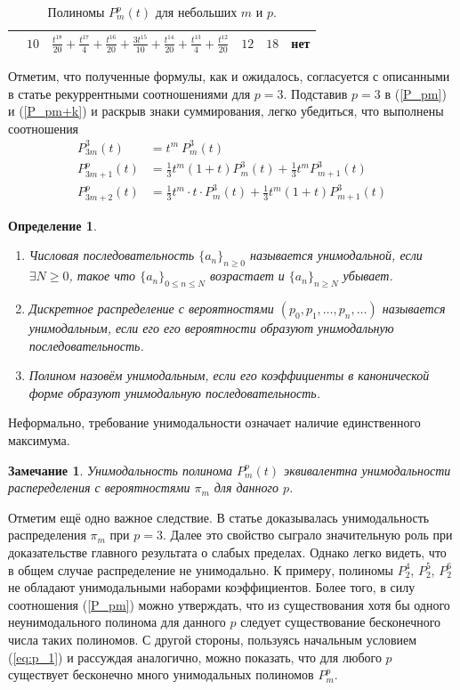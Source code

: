 \documentclass[14pt, a4paper, russian]{report}
\newtheorem{remark}{\indent Замечание}
\newtheorem{definition}{\indent Определение}
\begin{document}
\begin{table}[H]
\begin{small}
\begin{center}
\begin{tabular}{|c|c|c|c|c|c|}
                    & $10$ & $\frac{t^{18}}{20}+\frac{t^{17}}{4}+\frac{t^{16}}{20}+\frac{3 t^{15}}{10}+\frac{t^{14}}{20}+\frac{t^{13}}{4}+\frac{t^{12}}{20}$ & $12$ & $18$ & нет \\
\hline
\end{tabular}
\end{center}
\end{small}
\caption{\label{table:polynomials} Полиномы $P_m^p(t)$ для небольших $m$ и $p$.}
\end{table}

Отметим, что полученные формулы, как и ожидалось, согласуется с описанными в статье \cite{weaklimits} рекуррентными соотношениями для $p=3$. Подставив $p=3$ в (\ref{P_pm}) и (\ref{P_pm+k}) и раскрыв знаки суммирования, легко убедиться, что выполнены соотношения
\begin{align*}
P_{3m}^3(t) & =  t^{m}\ P_m^3(t) \\
P_{3m+1}^p(t) & =  \frac{1}{3} t^m (1 + t) P_m^3(t)  + \frac{1}{3} t^m P_{m+1}^3(t)\\
P_{3m+2}^p(t) & =  \frac{1}{3} t^m \cdot t\cdot  P_m^3(t)  + \frac{1}{3} t^m (1+t) P_{m+1}^3(t)
\end{align*}

\begin{definition} \nobreakspace\\
\begin{enumerate}
\item Числовая последовательность $\{a_n\}_{n \ge 0}$ называется унимодальной, если $\exists N \ge 0$, такое что $\{a_n\}_{0 \le n \le N}$ возрастает и $\{a_n\}_{n \ge N}$ убывает.
\item Дискретное распределение с вероятностями $(p_0,p_1,\ldots,p_n,\ldots)$ называется унимодальным, если его его вероятности образуют унимодальную последовательность.
\item Полином назовём унимодальным, если его коэффициенты в канонической форме образуют унимодальную последовательность.
\end{enumerate}
\end{definition}
Неформально, требование унимодальности означает наличие единственного максимума.
\begin{remark}
Унимодальность полинома $P_m^p(t)$ эквивалентна унимодальности распеределения с вероятностями $\pi_m$ для данного $p$.
\end{remark}

Отметим ещё одно важное следствие. В статье \cite{weaklimits} доказывалась унимодальность распределения $\pi_m$ при $p=3$. Далее это свойство сыграло значительную роль при доказательстве главного результата о слабых пределах. Однако легко видеть, что в общем случае распределение не унимодально. К примеру, полиномы $P_2^4$, $P_2^5$, $P_2^6$ не обладают унимодальными наборами коэффициентов. Более того, в силу соотношения (\ref{P_pm}) можно утверждать, что из существования хотя бы одного неунимодального полинома для данного $p$ следует существование бесконечного числа таких полиномов. С другой стороны, пользуясь начальным условием (\ref{eq:p_1}) и рассуждая аналогично, можно показать, что для любого $p$ существует бесконечно много унимодальных полиномов $P_m^p$.
\end{document}
